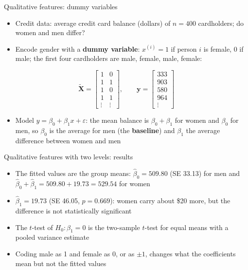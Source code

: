 \begin{frame}{Qualitative features: dummy variables}
    \begin{itemize}
        \item Credit data: average credit card balance (dollars) of $n = 400$ cardholders; do women and men differ?
        \item Encode gender with a \textbf{dummy variable}: $x^{(i)} = 1$ if person $i$ is female, $0$ if male; the first four cardholders are male, female, male, female:
    \end{itemize}
    \[
        \tilde{\mathbf{X}} = \begin{bmatrix} 1 & 0 \\ 1 & 1 \\ 1 & 0 \\ 1 & 1 \\ \vdots & \vdots \end{bmatrix}, \qquad \mathbf{y} = \begin{bmatrix} 333 \\ 903 \\ 580 \\ 964 \\ \vdots \end{bmatrix}
    \]
    \begin{itemize}
        \item Model $y = \beta_0 + \beta_1 x + \varepsilon$: the mean balance is $\beta_0 + \beta_1$ for women and $\beta_0$ for men, so $\beta_0$ is the average for men (the \textbf{baseline}) and $\beta_1$ the average difference between women and men
    \end{itemize}
\end{frame}


\begin{frame}{Qualitative features with two levels: results}
    \begin{itemize}
        \item The fitted values are the group means: $\hat\beta_0 = 509.80$ (SE 33.13) for men and $\hat\beta_0 + \hat\beta_1 = 509.80 + 19.73 = 529.54$ for women
        \item $\hat\beta_1 = 19.73$ (SE 46.05, $p = 0.669$): women carry about \$20 more, but the difference is not statistically significant
        \item The $t$-test of $H_0\colon \beta_1 = 0$ is the two-sample $t$-test for equal means with a pooled variance estimate
        \item Coding male as 1 and female as 0, or as $\pm 1$, changes what the coefficients mean but not the fitted values
    \end{itemize}
\end{frame}


